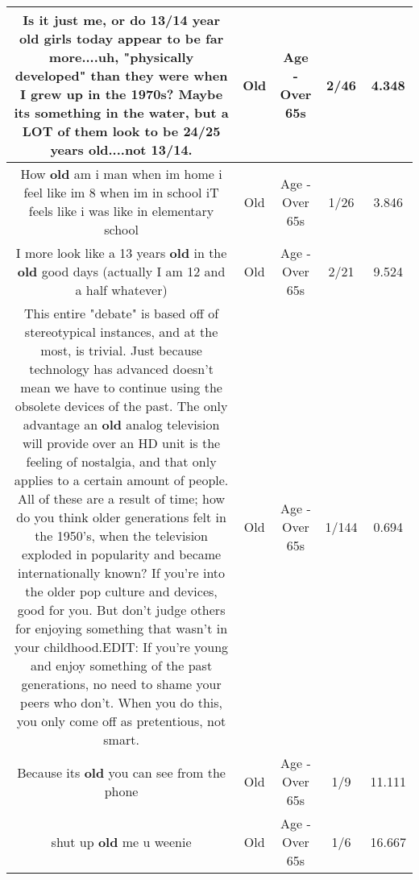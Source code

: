 \documentclass[11pt]{article}
\newlength\mylength
\begin{document}
\begin{center}
\begin{longtable}{|C{.65\mylength}|C{.30\mylength}|C{.12\mylength}|C{.12\mylength}|C{.12\mylength}|}
  \small Is it just me, or do 13/14 year \textbf{old} girls today appear to be far more....uh, "physically developed" than they were when I grew up in the 1970s? Maybe its something in the water, but a LOT of them look to be 24/25 years \textbf{old}....not 13/14.\normalsize   & Old & Age - Over 65s & 2/46 & 4.348 \\  \hline
  \small How \textbf{old} am i man when im home i feel like im 8 when im in school iT feels like i was like in elementary school\normalsize   & Old & Age - Over 65s & 1/26 & 3.846 \\  \hline
  \small I more look like a 13 years \textbf{old} in the \textbf{old} good days (actually I am 12 and a half whatever)\normalsize   & Old & Age - Over 65s & 2/21 & 9.524 \\  \hline
  \small This entire "debate" is based off of stereotypical instances, and at the most, is trivial. Just because technology has advanced doesn't mean we have to continue using the obsolete devices of the past. The only advantage an \textbf{old} analog television will provide over an HD unit is the feeling of nostalgia, and that only applies to a certain amount of people. All of these are a result of time; how do you think older generations felt in the 1950's, when the television exploded in popularity and became internationally known? If you're into the older pop culture and devices, good for you. But don't judge others for enjoying something that wasn't in your childhood.EDIT: If you're young and enjoy something of the past generations, no need to shame your peers who don't. When you do this, you only come off as pretentious, not smart.\normalsize   & Old & Age - Over 65s & 1/144 & 0.694 \\  \hline
  \small Because its \textbf{old} you can see from the phone\normalsize   & Old & Age - Over 65s & 1/9 & 11.111 \\  \hline
  \small shut up \textbf{old} me u weenie\normalsize   & Old & Age - Over 65s & 1/6 & 16.667 \\  \hline

\end{longtable}
\end{center}
\end{document}
